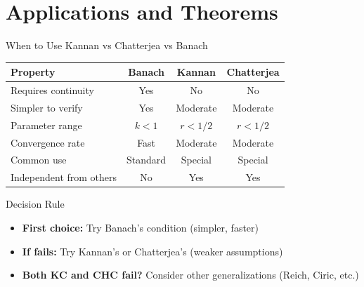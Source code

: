 \documentclass[aspectratio=169,10pt]{beamer}
\begin{document}
\section{Applications and Theorems}

\begin{frame}{When to Use Kannan vs Chatterjea vs Banach}
    \begin{table}[h]
        \centering
        \small
        \begin{tabular}{|l|c|c|c|}
        \hline
        \textbf{Property} & \textbf{Banach} & \textbf{Kannan} & \textbf{Chatterjea} \\
        \hline
        Requires continuity & Yes & No & No \\
        \hline
        Simpler to verify & Yes & Moderate & Moderate \\
        \hline
        Parameter range & $k < 1$ & $r < 1/2$ & $r < 1/2$ \\
        \hline
        Convergence rate & Fast & Moderate & Moderate \\
        \hline
        Common use & Standard & Special & Special \\
        \hline
        Independent from others & No & Yes & Yes \\
        \hline
        \end{tabular}
    \end{table}

    \vspace{0.3cm}
    \begin{block}{Decision Rule}
        \begin{itemize}
            \item \textbf{First choice:} Try Banach's condition (simpler, faster)
            \item \textbf{If fails:} Try Kannan's or Chatterjea's (weaker assumptions)
            \item \textbf{Both KC and CHC fail?} Consider other generalizations (Reich, Ciric, etc.)
        \end{itemize}
    \end{block}
\end{frame}
\end{document}

